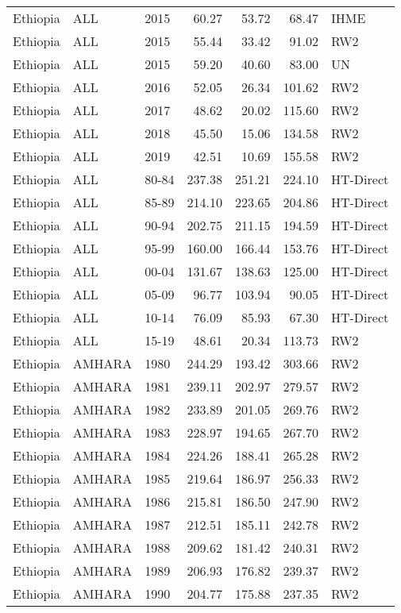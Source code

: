 \begin{longtable}{lllrrrl}
  Ethiopia & ALL & 2015 & 60.27 & 53.72 & 68.47 & IHME \\ 
  Ethiopia & ALL & 2015 & 55.44 & 33.42 & 91.02 & RW2 \\ 
  Ethiopia & ALL & 2015 & 59.20 & 40.60 & 83.00 & UN \\ 
  Ethiopia & ALL & 2016 & 52.05 & 26.34 & 101.62 & RW2 \\ 
  Ethiopia & ALL & 2017 & 48.62 & 20.02 & 115.60 & RW2 \\ 
  Ethiopia & ALL & 2018 & 45.50 & 15.06 & 134.58 & RW2 \\ 
  Ethiopia & ALL & 2019 & 42.51 & 10.69 & 155.58 & RW2 \\ 
  Ethiopia & ALL & 80-84 & 237.38 & 251.21 & 224.10 & HT-Direct \\ 
  Ethiopia & ALL & 85-89 & 214.10 & 223.65 & 204.86 & HT-Direct \\ 
  Ethiopia & ALL & 90-94 & 202.75 & 211.15 & 194.59 & HT-Direct \\ 
  Ethiopia & ALL & 95-99 & 160.00 & 166.44 & 153.76 & HT-Direct \\ 
  Ethiopia & ALL & 00-04 & 131.67 & 138.63 & 125.00 & HT-Direct \\ 
  Ethiopia & ALL & 05-09 & 96.77 & 103.94 & 90.05 & HT-Direct \\ 
  Ethiopia & ALL & 10-14 & 76.09 & 85.93 & 67.30 & HT-Direct \\ 
  Ethiopia & ALL & 15-19 & 48.61 & 20.34 & 113.73 & RW2 \\ 
  Ethiopia & AMHARA & 1980 & 244.29 & 193.42 & 303.66 & RW2 \\ 
  Ethiopia & AMHARA & 1981 & 239.11 & 202.97 & 279.57 & RW2 \\ 
  Ethiopia & AMHARA & 1982 & 233.89 & 201.05 & 269.76 & RW2 \\ 
  Ethiopia & AMHARA & 1983 & 228.97 & 194.65 & 267.70 & RW2 \\ 
  Ethiopia & AMHARA & 1984 & 224.26 & 188.41 & 265.28 & RW2 \\ 
  Ethiopia & AMHARA & 1985 & 219.64 & 186.97 & 256.33 & RW2 \\ 
  Ethiopia & AMHARA & 1986 & 215.81 & 186.50 & 247.90 & RW2 \\ 
  Ethiopia & AMHARA & 1987 & 212.51 & 185.11 & 242.78 & RW2 \\ 
  Ethiopia & AMHARA & 1988 & 209.62 & 181.42 & 240.31 & RW2 \\ 
  Ethiopia & AMHARA & 1989 & 206.93 & 176.82 & 239.37 & RW2 \\ 
  Ethiopia & AMHARA & 1990 & 204.77 & 175.88 & 237.35 & RW2 \\ 

\end{longtable}
